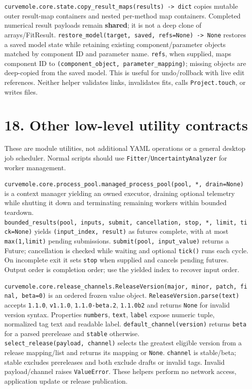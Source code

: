 \documentclass[
  10pt,
  a4paper,
  oneside]{scrreprt}
\begin{document}
\texttt{curvemole.core.state.copy\_result\_maps(results)\ -\textgreater{}\ dict}
copies mutable outer result-map containers and nested per-method map
containers. Completed numerical result payloads remain \textbf{shared};
it is not a deep clone of arrays/FitResult.
\texttt{restore\_model(target,\ saved,\ refs=None)\ -\textgreater{}\ None}
restores a saved model state while retaining existing
component/parameter objects matched by component ID and parameter name.
\texttt{refs}, when supplied, maps component ID to
\texttt{(component\_object,\ parameter\_mapping)}; missing objects are
deep-copied from the saved model. This is useful for undo/rollback with
live edit references. Neither helper validates links, invalidates fits,
calls \texttt{Project.touch}, or writes files.

\hypertarget{other-low-level-utility-contracts}{%
\section{18. Other low-level utility
contracts}\label{other-low-level-utility-contracts}}

These are module utilities, not additional YAML operations or a general
desktop job scheduler. Normal scripts should use
\texttt{Fitter}/\texttt{UncertaintyAnalyzer} for worker management.

\texttt{curvemole.core.process\_pool.managed\_process\_pool(pool,\ *,\ drain=None)}
is a context manager yielding an owned executor, draining optional
telemetry while shutting it down and terminating remaining workers
within bounded teardown.
\texttt{bounded\_results(pool,\ inputs,\ submit,\ cancellation,\ stop,\ *,\ limit,\ tick=None)}
yields \texttt{(input\_index,\ result)} as futures complete, with at
most \texttt{max(1,limit)} pending submissions.
\texttt{submit(pool,\ input\_value)} returns a Future; cancellation is
checked while waiting and optional \texttt{tick()} runs each cycle. On
incomplete exit it sets \texttt{stop} when supplied and cancels pending
futures. Output order is completion order; use the yielded index to
recover input order.

\texttt{curvemole.core.release\_channels.ReleaseVersion(major,\ minor,\ patch,\ final,\ beta=0)}
is an ordered frozen value object. \texttt{ReleaseVersion.parse(text)}
accepts \texttt{1.1.0}, \texttt{v1.1.0}, \texttt{1.1.0-beta.2},
\texttt{1.1.0b2} and returns \texttt{None} for invalid version syntax.
Properties \texttt{numbers}, \texttt{text}, \texttt{label} expose
numeric tuple, normalized tag text and readable label.
\texttt{default\_channel(version)} returns \texttt{beta} for a parsed
prerelease and \texttt{stable} otherwise.
\texttt{select\_release(payload,\ channel)} selects the greatest
eligible version from a release mapping/list and returns its mapping or
\texttt{None}. \texttt{channel} is stable/beta; stable excludes
prereleases and both exclude drafts or invalid tags. Invalid
payload/channel raises \texttt{ValueError}. These helpers perform no
network access, application update or release publication.
\end{document}
